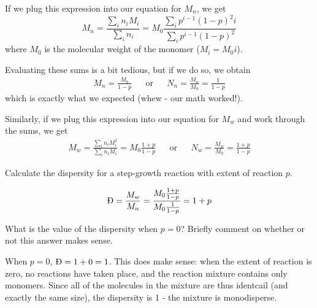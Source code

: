 \begin{activity}
\begin{model}
	If we plug this expression into our equation for $M_n$, we get
	\begin{equation*}
		M_n = \frac{\sum_i n_i M_i}{\sum_i n_i} %
		= M_0\frac{\sum_i p^{i-1}(1-p)^2 i }{\sum_i p^{i-1}(1-p)^2}
	\end{equation*}
	where $M_0$ is the molecular weight of the monomer ($M_i = M_0 i$).
	
	\vspace{0.25in}
	
	Evaluating these sums is a bit tedious, but if we do so, we obtain
	\begin{align*}
		M_n = \frac{M_0}{1-p} && \text{or} && N_n = \frac{M_n}{M_0} = \frac{1}{1-p}
	\end{align*}
	which is exactly what we expected (whew - our math worked!).
	
	\vspace{0.25in}
	Similarly, if we plug this expression into our equation for $M_w$ and work through the sums, we get
	\begin{align*}
		M_w = \frac{\sum_i n_i M_i^2}{\sum_i n_i M_i} = M_0\frac{1+p}{1-p} && \text{or} && N_w = \frac{M_w}{M_0} = \frac{1+p}{1-p}
	\end{align*}

\end{model}

\begin{ctqs}
		\question Calculate the dispersity for a step-growth reaction with extent of reaction $p$.
		
			\begin{solution}[1.95in]
			
				\begin{equation*}
					\text{\DJ} = \frac{M_w}{M_n} = \frac{M_0\frac{1+p}{1-p}}{M_0\frac{1}{1-p}} = 1+p
				\end{equation*}
			\end{solution}
			
			
		\question What is the value of the dispersity when $p=0$?  Briefly comment on whether or not this answer makes sense.
		
			\begin{solution}[1.5in]
			
				When $p=0$, $\text{\DJ}=1+0 = 1$.  This does make sense: when the extent of reaction is zero, no reactions have taken place, and the reaction mixture contains only monomers.  Since all of the molecules in the mixture are thus identcail (and exactly the same size), the dispersity is 1 - the mixture is monodisperse.
			

\end{solution}
\end{ctqs}
\end{activity}
